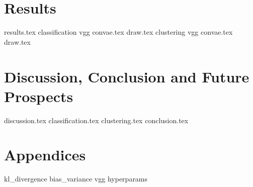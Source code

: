 \documentclass[12pt]{uiofysmaster}
\begin{document}
\part{Results}\label{part:results}
{results.tex}
{classification}
{vgg}
{convae.tex}
{draw.tex}
{clustering}
{vgg}
{convae.tex}
{draw.tex}


\part{Discussion, Conclusion and Future Prospects}\label{part:discuss_concludee}
{discussion.tex}
{classification.tex}
{clustering.tex}
{conclusion.tex}

\part{Appendices}
\appendix
{kl_divergence}
{bias_variance}
{vgg}
{hyperparams}

% 
%


\end{document}
